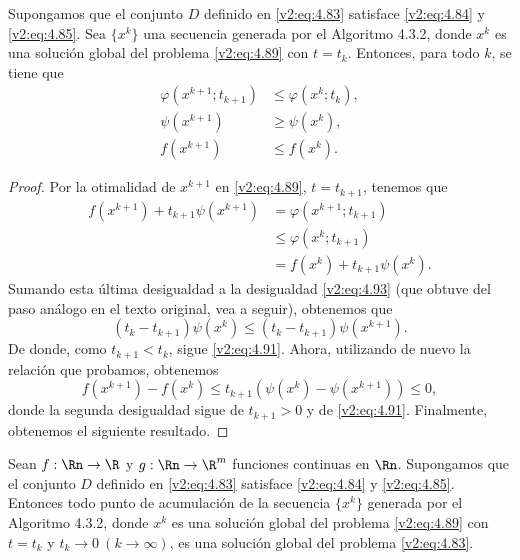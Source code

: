 \begin{proposition}\label{v2:prop:4.3.3}
    Supongamos que el conjunto $D$ definido en \eqref{v2:eq:4.83} satisface \eqref{v2:eq:4.84} y \eqref{v2:eq:4.85}. Sea $\{x^k\}$ una secuencia generada por el Algoritmo 4.3.2, donde $x^k$ es una solución global del problema \eqref{v2:eq:4.89} con $t = t_k$.
    Entonces, para todo $k$, se tiene que
    \begin{align}
        \varphi(x^{k+1}; t_{k+1}) &\le \varphi(x^k; t_k), \label{v2:eq:4.90} \\
        \psi(x^{k+1}) &\ge \psi(x^k), \label{v2:eq:4.91} \\
        f(x^{k+1}) &\le f(x^k). \label{v2:eq:4.92}
    \end{align}
\end{proposition}

\begin{proof}
    Por la otimalidad de $x^{k+1}$ en \eqref{v2:eq:4.89}, $t = t_{k+1}$, tenemos que
    \begin{align*}
        f(x^{k+1}) + t_{k+1}\psi(x^{k+1}) &= \varphi(x^{k+1}; t_{k+1}) \\
        &\le \varphi(x^k; t_{k+1}) \\
        &= f(x^k) + t_{k+1}\psi(x^k).
    \end{align*}
    Sumando esta última desigualdad a la desigualdad \eqref{v2:eq:4.93} (que obtuve del paso análogo en el texto original, vea a seguir), obtenemos que
    \[
        (t_k - t_{k+1})\psi(x^k) \le (t_k - t_{k+1})\psi(x^{k+1}).
    \]
    De donde, como $t_{k+1} < t_k$, sigue \eqref{v2:eq:4.91}.
    Ahora, utilizando de nuevo la relación que probamos, obtenemos
    \[
        f(x^{k+1}) - f(x^k) \le t_{k+1}(\psi(x^k) - \psi(x^{k+1})) \le 0,
    \]
    donde la segunda desigualdad sigue de $t_{k+1} > 0$ y de \eqref{v2:eq:4.91}.
    Finalmente, obtenemos el siguiente resultado.
\end{proof}

\begin{theorem}\label{v2:thm:4.3.7}
    Sean $f : \Rn \to \R$ y $g : \Rn \to \R^m$ funciones continuas en $\Rn$. Supongamos que el conjunto $D$ definido en \eqref{v2:eq:4.83} satisface \eqref{v2:eq:4.84} y \eqref{v2:eq:4.85}.
    Entonces todo punto de acumulación de la secuencia $\{x^k\}$ generada por el Algoritmo 4.3.2, donde $x^k$ es una solución global del problema \eqref{v2:eq:4.89} con $t = t_k$ y $t_k \to 0 \ (k \to \infty)$, es una solución global del problema \eqref{v2:eq:4.83}.
\end{theorem}

